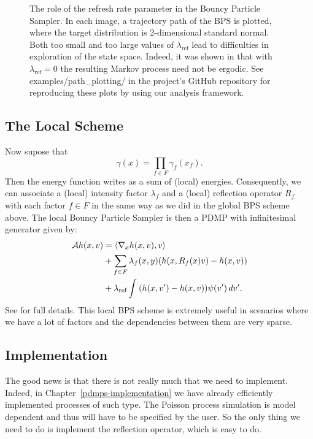 \documentclass[report.tex]{subfiles}
\begin{document}
\begin{figure}
  \caption{The role of the refresh rate parameter in the Bouncy Particle Sampler.
           In each image, a trajectory path of the BPS is plotted, where
           the target distribution is 2-dimensional standard normal.
           Both too small and too large values of $\lambda_{\text{ref}}$ lead to
           difficulties in exploration of the state space. Indeed, it was shown
           in \citet{bouchard2015bouncy} that with $\lambda_{\text{ref}} = 0$ the
           resulting Markov process need not be ergodic.
           See examples/path\_plotting/ in the project's GitHub repository for
           reproducing these plots by using our analysis framework.}
  \label{image-bps-refresh-rates}
\end{figure}

\subsection{The Local Scheme}

Now supose that
$$
\gamma(x) = \prod_{f \in F} \gamma_{f}(x_{f}).
$$
Then the energy function writes as a sum of (local) energies.
Consequently, we can associate a (local) intensity factor $\lambda_{f}$ and a (local) reflection
operator $R_{f}$ with each factor $f \in F$ in the same way as we did in the global BPS scheme above.
The local Bouncy Particle Sampler is then a PDMP with infinitesimal generator given by:
\begin{align*}
  \mathcal{A}h(x, v) &= \langle \nabla_{x} h(x, v), v\rangle \\
                     &+ \sum_{f \in F} \lambda_{f}(x, y)(h(x, R_{f}(x)v) - h(x, v)) \\
                     &+ \lambda_{\text{ref}} \int_{{}}^{{}} {(h(x, v') - h(x, v))\psi(v')}\, d{v'}.
\end{align*}
See \cite{bouchard2015bouncy} for full details. This local BPS scheme is extremely useful
in scenarios where we have a lot of factors and the dependencies between them are very
sparse.

\subsection{Implementation}
The good news is that there is not really much that we need to implement.
Indeed, in Chapter~\ref{pdmps-implementation} we have already efficiently implemented
processes of such type.
The Poisson process simulation is model dependent and thus will have to be specified by the user.
So the only thing we need to do is implement the reflection operator, which is easy to do.
\end{document}
